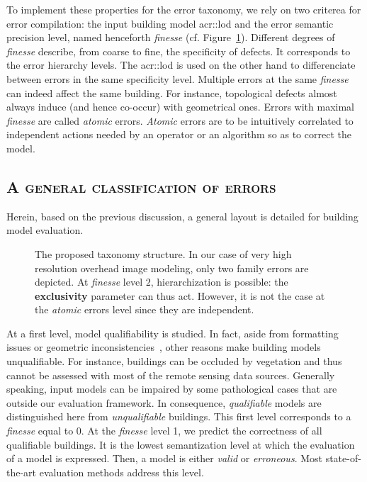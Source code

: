             To implement these properties for the error taxonomy, we rely on two criterea for error compilation: the input building model \gls{acr::lod} and the error semantic precision level, named henceforth \textit{finesse} (cf. Figure~\ref{fig::taxonomy}).
            Different degrees of \textit{finesse} describe, from coarse to fine, the specificity of defects.
            It corresponds to the error hierarchy levels.
            The \gls{acr::lod} is used on the other hand to differenciate between errors in the same specificity level.
            Multiple errors at the same \textit{finesse} can indeed affect the same building.
            For instance, topological defects almost always induce (and hence co-occur) with geometrical ones.
            Errors with maximal \textit{finesse} are called \textit{atomic} errors.
            \textit{Atomic} errors are to be intuitively correlated to independent actions needed by an operator or an algorithm so as to correct the model.

    \subsection{\textsc{A general classification of errors}}
        Herein, based on the previous discussion, a general layout is detailed for building model evaluation.

        \begin{figure}
            \begin{center}
                
                \caption{
                    \label{fig::taxonomy} 
                    The proposed taxonomy structure.
                    In our case of very high resolution overhead image modeling, only two family errors are depicted.
                    At \textit{finesse} level $2$, hierarchization is possible: the \textbf{exclusivity} parameter can thus act.
                    However, it is not the case at the \textit{atomic} errors level since they are independent.
                }
            \end{center}
        \end{figure}

        At a first level, model qualifiability is studied.
        In fact, aside from formatting issues or geometric inconsistencies~\parencite{ledoux2018val3dity}, other reasons make building models unqualifiable.
        For instance, buildings can be occluded by vegetation and thus cannot be assessed with most of the remote sensing data sources.
        Generally speaking, input models can be impaired by some pathological cases that are outside our evaluation framework.
        In consequence, \textit{qualifiable} models are distinguished here from \textit{unqualifiable} buildings.
        This first level corresponds to a \textit{finesse} equal to 0. At the \textit{finesse} level 1, we predict the correctness of all qualifiable buildings.
        It is the lowest semantization level at which the evaluation of a model is expressed.
        Then, a model is either \textit{valid} or \textit{erroneous}.
        Most state-of-the-art evaluation methods address this level.

